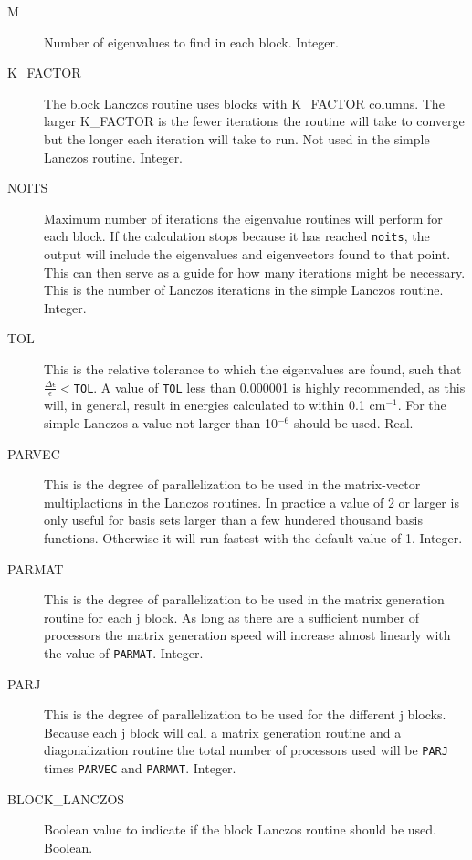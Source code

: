 \documentclass{article}
\newcommand{\wn}{cm$^{-1}$}
\begin{document}
\begin{description}
\item[M] Number of eigenvalues to find in each block. Integer.

\item[K\_FACTOR] The block Lanczos routine uses blocks with 
  K\_FACTOR columns. The larger K\_FACTOR is the fewer iterations
  the routine will take to converge but the longer each iteration
  will take to run. Not used in the simple Lanczos routine. Integer.

\item[NOITS] Maximum number of iterations the eigenvalue routines
  will perform for each block. If the calculation stops because it has
  reached {\tt noits}, the output will include the eigenvalues and
  eigenvectors found to that point. This can then serve as a guide for
  how many iterations might be necessary. This is the number of Lanczos
  iterations in the simple Lanczos routine. Integer.

\item[TOL] This is the relative tolerance to which
  the eigenvalues are found, such that $\frac{\Delta \epsilon
    }{\epsilon } < ${\tt TOL}. A value of {\tt TOL} less than 0.000001 is highly
  recommended, as this will, in general, result in energies calculated
  to within 0.1 \wn . For the simple Lanczos a value not larger than 10$^{-6}$
  should be used. Real.
  
\item[PARVEC] This is the degree of parallelization to be used in
  the matrix-vector multiplactions in the Lanczos routines. In 
  practice a value of 2 or larger is only useful for basis sets larger than
  a few hundered thousand basis functions. Otherwise it will run
  fastest with the default value of 1. Integer.

\item[PARMAT] This is the degree of parallelization to be used in
  the matrix generation routine for each j block. As long as there are
  a sufficient number of processors the matrix generation speed 
  will increase almost linearly with the value of {\tt PARMAT}. Integer.

\item[PARJ] This is the degree of parallelization to be used for
  the different j blocks.  Because each j block will call a matrix
  generation routine and a diagonalization routine the total number
  of processors used will be {\tt PARJ} times {\tt PARVEC} and {\tt PARMAT}. Integer.

\item[BLOCK\_LANCZOS] Boolean value to indicate if the block Lanczos
  routine should be used. Boolean.

\end{description}
\end{document}
